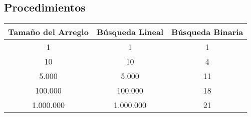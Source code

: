 \subsection{Procedimientos}


\begin{center}
\begin{tabular}{|c|c|c|}
\hline
\cellcolor[gray]{0.85} \textbf{Tamaño del Arreglo} & 	\cellcolor[gray]{0.85} \textbf{Búsqueda Lineal} 		& 	\cellcolor[gray]{0.85} \textbf{Búsqueda Binaria}\\

\hline
1	&	1	&	1  \\
\hline
10	&	10	&	4\\
\hline
5.000	&	5.000	&	11  \\
\hline
100.000	&	100.000	&	18  \\
\hline
1.000.000	&	1.000.000	&	21  \\
\hline
\end{tabular}
\end{center}

